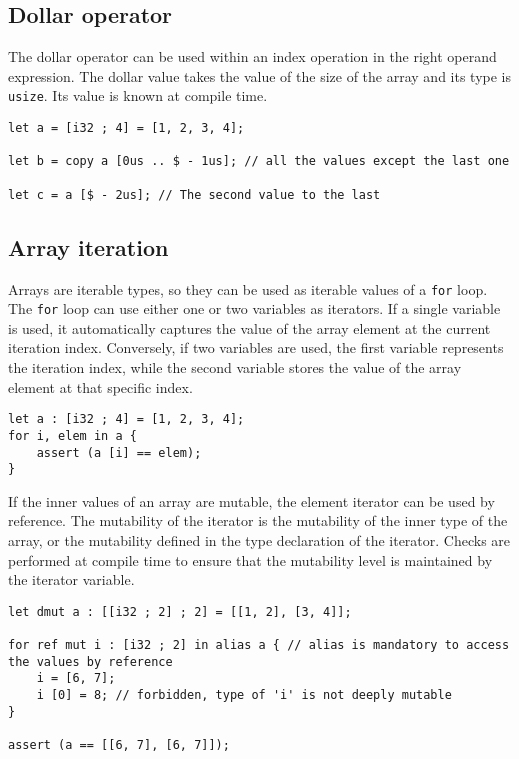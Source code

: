 \subsection {Dollar operator}

The dollar operator can be used within an index operation in the right operand
expression. The dollar value takes the value of the size of the array and its
type is \texttt{usize}. Its value is known at compile time.

\begin{lstlisting}[style=coloredverbatim]
let a = [i32 ; 4] = [1, 2, 3, 4];

let b = copy a [0us .. $ - 1us]; // all the values except the last one

let c = a [$ - 2us]; // The second value to the last
\end{lstlisting}

\subsection {Array iteration}

Arrays are iterable types, so they can be used as iterable values of a
\texttt{for} loop. The \texttt{for} loop can use either one or two variables as
iterators. If a single variable is used, it automatically captures the value of
the array element at the current iteration index. Conversely, if two variables
are used, the first variable represents the iteration index, while the second
variable stores the value of the array element at that specific index.

\begin{lstlisting}[style=coloredverbatim]
let a : [i32 ; 4] = [1, 2, 3, 4];
for i, elem in a {
    assert (a [i] == elem);
}
\end{lstlisting}

If the inner values of an array are mutable, the element iterator can be used by
reference. The mutability of the iterator is the mutability of the inner type of
the array, or the mutability defined in the type declaration of the iterator.
Checks are performed at compile time to ensure that the mutability level is
maintained by the iterator variable.

\begin{lstlisting}[style=coloredverbatim]
let dmut a : [[i32 ; 2] ; 2] = [[1, 2], [3, 4]];

for ref mut i : [i32 ; 2] in alias a { // alias is mandatory to access the values by reference
    i = [6, 7];
    i [0] = 8; // forbidden, type of 'i' is not deeply mutable
}

assert (a == [[6, 7], [6, 7]]);
\end{lstlisting}


